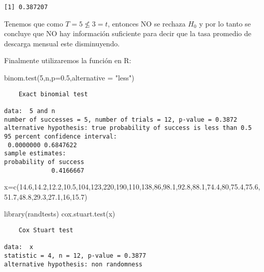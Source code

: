 \documentclass[
  a4paper,
  oneside,
  openany]{book}
\newenvironment{Shaded}{\begin{snugshade}}{\end{snugshade}}
\newcommand{\AttributeTok}[1]{\textcolor[rgb]{0.77,0.63,0.00}{#1}}
\newcommand{\DecValTok}[1]{\textcolor[rgb]{0.00,0.00,0.81}{#1}}
\newcommand{\FloatTok}[1]{\textcolor[rgb]{0.00,0.00,0.81}{#1}}
\newcommand{\FunctionTok}[1]{\textcolor[rgb]{0.00,0.00,0.00}{#1}}
\newcommand{\NormalTok}[1]{#1}
\newcommand{\OtherTok}[1]{\textcolor[rgb]{0.56,0.35,0.01}{#1}}
\newcommand{\StringTok}[1]{\textcolor[rgb]{0.31,0.60,0.02}{#1}}
\begin{document}
\begin{verbatim}
[1] 0.387207
\end{verbatim}

Tenemos que como \(T=5\nleq 3 =t\), entonces NO se rechaza \(H_0\) y por lo tanto se concluye que NO hay información suficiente para decir que la tasa promedio de descarga mensual este disminuyendo.

Finalmente utilizaremos la función en R:

\begin{Shaded}
\begin{Highlighting}[]
\FunctionTok{binom.test}\NormalTok{(}\DecValTok{5}\NormalTok{,n,}\AttributeTok{p=}\FloatTok{0.5}\NormalTok{,}\AttributeTok{alternative =} \StringTok{"less"}\NormalTok{)}
\end{Highlighting}
\end{Shaded}

\begin{verbatim}
    Exact binomial test

data:  5 and n
number of successes = 5, number of trials = 12, p-value = 0.3872
alternative hypothesis: true probability of success is less than 0.5
95 percent confidence interval:
 0.0000000 0.6847622
sample estimates:
probability of success 
             0.4166667 
\end{verbatim}

\begin{Shaded}
\begin{Highlighting}[]
\NormalTok{x}\OtherTok{=}\FunctionTok{c}\NormalTok{(}\FloatTok{14.6}\NormalTok{,}\FloatTok{14.2}\NormalTok{,}\FloatTok{12.2}\NormalTok{,}\FloatTok{10.5}\NormalTok{,}\DecValTok{104}\NormalTok{,}\DecValTok{123}\NormalTok{,}\DecValTok{220}\NormalTok{,}\DecValTok{190}\NormalTok{,}\DecValTok{110}\NormalTok{,}\DecValTok{138}\NormalTok{,}\DecValTok{86}\NormalTok{,}\FloatTok{98.1}\NormalTok{,}\FloatTok{92.8}\NormalTok{,}\FloatTok{88.1}\NormalTok{,}\FloatTok{74.4}\NormalTok{,}\DecValTok{80}\NormalTok{,}\FloatTok{75.4}\NormalTok{,}\FloatTok{75.6}\NormalTok{,}\FloatTok{51.7}\NormalTok{,}\FloatTok{48.8}\NormalTok{,}\FloatTok{29.3}\NormalTok{,}\FloatTok{27.1}\NormalTok{,}\DecValTok{16}\NormalTok{,}\FloatTok{15.7}\NormalTok{)}


\FunctionTok{library}\NormalTok{(randtests)}
\FunctionTok{cox.stuart.test}\NormalTok{(x)}
\end{Highlighting}
\end{Shaded}

\begin{verbatim}
    Cox Stuart test

data:  x
statistic = 4, n = 12, p-value = 0.3877
alternative hypothesis: non randomness
\end{verbatim}
\end{document}
